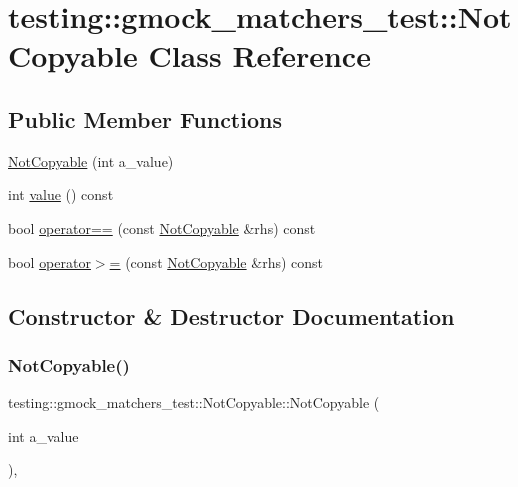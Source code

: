 \hypertarget{classtesting_1_1gmock__matchers__test_1_1_not_copyable}{}\section{testing\+:\+:gmock\+\_\+matchers\+\_\+test\+:\+:Not\+Copyable Class Reference}
\label{classtesting_1_1gmock__matchers__test_1_1_not_copyable}
\subsection*{Public Member Functions}
\begin{DoxyCompactItemize}
\item 
\hyperlink{classtesting_1_1gmock__matchers__test_1_1_not_copyable_a3d15763c115415a26d8acc9ce5a26e19}{Not\+Copyable} (int a\+\_\+value)
\item 
int \hyperlink{classtesting_1_1gmock__matchers__test_1_1_not_copyable_af6c134767462948fa8dbd35c68370004}{value} () const
\item 
bool \hyperlink{classtesting_1_1gmock__matchers__test_1_1_not_copyable_a2e68fcd9a588a184d54e6b54e41fb978}{operator==} (const \hyperlink{classtesting_1_1gmock__matchers__test_1_1_not_copyable}{Not\+Copyable} \&rhs) const
\item 
bool \hyperlink{classtesting_1_1gmock__matchers__test_1_1_not_copyable_a36eb6a25f5559bee00fe52a6d86b42d6}{operator$>$=} (const \hyperlink{classtesting_1_1gmock__matchers__test_1_1_not_copyable}{Not\+Copyable} \&rhs) const
\end{DoxyCompactItemize}


\subsection{Constructor \& Destructor Documentation}
\mbox{\label{classtesting_1_1gmock__matchers__test_1_1_not_copyable_a3d15763c115415a26d8acc9ce5a26e19}} 
\subsubsection{\texorpdfstring{Not\+Copyable()}{NotCopyable()}}
{\footnotesize\ttfamily testing\+::gmock\+\_\+matchers\+\_\+test\+::\+Not\+Copyable\+::\+Not\+Copyable (\begin{DoxyParamCaption}\item[{int}]{a\+\_\+value }\end{DoxyParamCaption})\hspace{0.3cm}{\ttfamily [inline]}, {\ttfamily [explicit]}}



